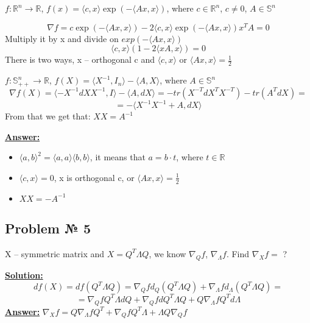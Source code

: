 $f: \mathbb{R}^n \xrightarrow{} \mathbb{R}$, $f(x) = \langle c, x \rangle \exp(-\langle Ax, x \rangle)$, where $c \in \mathbb{R}^n$, $c \not= 0$, $A \in \mathbb{S}^n$

\begin{equation*}
    \nabla f = c \exp(-\langle Ax, x\rangle) - 2\langle c, x \rangle \exp(-\langle Ax, x\rangle) x^TA = 0
\end{equation*}
Multiply it by x and divide on $exp(-\langle Ax, x\rangle)$
\begin{equation*}
 \langle c, x \rangle (1-2\langle xA, x\rangle) = 0
\end{equation*}
There is two ways, x -- orthogonal c and $\langle c, x \rangle$ or $\langle Ax, x \rangle = \frac{1}{2}$


$f: \mathbb{S}_{++}^n \xrightarrow{} \mathbb{R}$, $f(X) = \langle X^{-1}, I_n \rangle -\langle A, X \rangle$, where $A \in \mathbb{S}^n$
\begin{equation*}
        \nabla f(X) = \langle -X^{-1}dXX^{-1}, I \rangle - \langle A, dX \rangle = -tr(X^{-T}dX^{T}X^{-T}) - tr(A^TdX) = 
\end{equation*}
\begin{equation*}
    = -\langle X^{-1}X^{-1} + A, dX \rangle
\end{equation*}
From that we get that: $XX = A^{-1}$

\underline{\textbf{Answer:}} 
\begin{itemize}
    \item $\langle a, b \rangle^2 = \langle a , a\rangle \langle b, b \rangle$, it means that $a = b\cdot t$, where $t \in \mathbb{R}$
    \item $\langle c, x \rangle = 0$, x is orthogonal c, or $\langle Ax, x \rangle = \frac{1}{2}$
    \item $XX = -A^{-1}$
\end{itemize}

\subsection{Problem № 5} 
X -- symmetric matrix and $X = Q^T \Lambda Q$, we know $\nabla_{Q} f$, $\nabla_{\Lambda}f$. Find $\nabla_X f = $ ?

\underline{\textbf{Solution:}} 
\begin{equation*}
    df(X) = d f(Q^T\Lambda Q) = \nabla_{Q}f d_Q (Q^T\Lambda Q) + \nabla_{\Lambda}f d_{\Lambda}(Q^T\Lambda Q) = 
\end{equation*}
\begin{equation*}
    =\nabla_Q f Q^T\Lambda dQ +  \nabla_Q f dQ^T\Lambda Q + Q\nabla_{\Lambda}fQ^T d\Lambda 
\end{equation*}
\underline{\textbf{Answer:}} $\nabla_X f = Q\nabla_{\Lambda}fQ^T + \nabla_Q f Q^T\Lambda + \Lambda Q \nabla_Q f$
